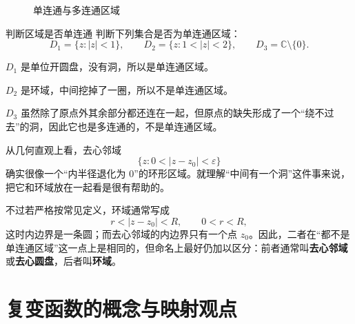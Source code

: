 \begin{figure}[htbp]
\centering
{}
\caption{单连通与多连通区域}
\label{fig:ch02-simply-connected}
\end{figure}

\begin{lizi}{判断区域是否单连通}{}
判断下列集合是否为单连通区域：
\[
    D_1=\{z:|z|<1\},\qquad D_2=\{z:1<|z|<2\},\qquad D_3=\mathbb{C}\setminus\{0\}.
\]

\begin{jie}
$D_1$ 是单位开圆盘，没有洞，所以是单连通区域。

$D_2$ 是环域，中间挖掉了一圈，所以不是单连通区域。

$D_3$ 虽然除了原点外其余部分都还连在一起，但原点的缺失形成了一个``绕不过去''的洞，因此它也是多连通的，不是单连通区域。
\end{jie}
\end{lizi}

\begin{tishi}[去心邻域能不能看成环形区域]
从几何直观上看，去心邻域
\[
    \{z:0<|z-z_0|<\varepsilon\}
\]
确实很像一个``内半径退化为 $0$''的环形区域。就理解``中间有一个洞''这件事来说，把它和环域放在一起看是很有帮助的。

不过若严格按常见定义，环域通常写成
\[
    r<|z-z_0|<R,\qquad 0<r<R,
\]
这时内边界是一条圆；而去心邻域的内边界只有一个点 $z_0$。因此，二者在``都不是单连通区域''这一点上是相同的，但命名上最好仍加以区分：前者通常叫\textbf{去心邻域}或\textbf{去心圆盘}，后者叫\textbf{环域}。
\end{tishi}

\section{复变函数的概念与映射观点}

